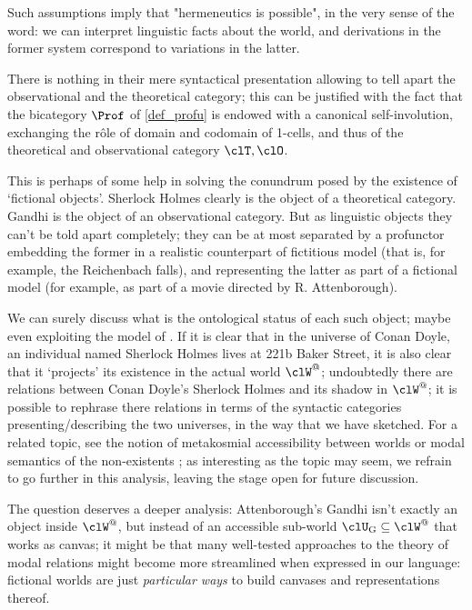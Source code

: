Such assumptions imply that "hermeneutics is possible", in the very sense of the word: we can interpret linguistic facts about the world, and derivations in the former system correspond to variations in the latter.
\begin{remark}
	There is nothing in their mere syntactical presentation allowing to tell apart the observational and the theoretical category; this can be justified with the fact that the bicategory $\Prof$ of \autoref{def_profu} is endowed with a canonical self-involution, exchanging the r\^ole of domain and codomain of 1-cells, and thus of the theoretical and observational category $\clT,\clO$.
	
	This is perhaps of some help in solving the conundrum posed by the existence of `fictional objects'. Sherlock Holmes clearly is the object of a theoretical category. Gandhi is the object of an observational category. But as linguistic objects they can't be told apart completely; they can be at most separated by a profunctor embedding the former in a realistic counterpart of fictitious model (that is, for example, the Reichenbach falls), and representing the latter as part of a fictional model (for example, as part of a movie directed by R. Attenborough).

	We can surely discuss what is the ontological status of each such object; maybe even exploiting the model of \cite{catont1}. If it is clear that in the universe of Conan Doyle, an individual named Sherlock Holmes lives at 221b Baker Street, it is also clear that it `projects' its existence in the actual world $\clW^@$; undoubtedly there are relations between Conan Doyle's Sherlock Holmes and its shadow in $\clW^@$; it is possible to rephrase there relations in terms of the syntactic categories presenting/describing the two universes, in the way that we have sketched. For a related topic, see the notion of metakosmial accessibility between worlds \cite{} or modal semantics of the non-existents \cite{}; as interesting as the topic may seem, we refrain to go further in this analysis, leaving the stage open for future discussion.
	
	The question deserves a deeper analysis: Attenborough's Gandhi isn't exactly an object inside $\clW^@$, but instead of an accessible sub-world $\clU_\text{G} \subseteq \clW^@$ that works as canvas; it might be that many well-tested approaches to the theory of modal relations might become more streamlined when expressed in our language: fictional worlds are just \emph{particular ways} to build canvases and representations thereof. 
\end{remark}
